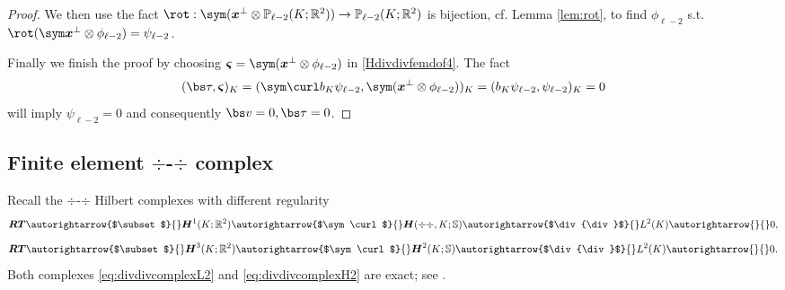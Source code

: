 \begin{proof}
We then use the fact $\rot: \sym(\boldsymbol x^{\perp}\otimes\mathbb P_{\ell-2}(K;\mathbb R^2)) \to  \mathbb P_{\ell-2}(K;\mathbb R^2)$ is bijection, cf. Lemma \ref{lem:rot}, to find $\phi_{\ell-2}$ s.t. $\rot (\sym\boldsymbol x^{\perp}\otimes\phi_{\ell -2}) = \psi_{\ell-2}$.

Finally we finish the proof by choosing $\boldsymbol \varsigma = \sym (\boldsymbol x^{\perp}\otimes \phi_{\ell -2})$ in \eqref{Hdivdivfemdof4}. The fact 
$$
(\bs \tau, \boldsymbol \varsigma)_K = (\sym\curl b_K\psi_{\ell-2},  \sym (\boldsymbol x^{\perp}\otimes \phi_{\ell -2}))_K = ( b_K\psi_{\ell-2}, \psi_{\ell-2} )_K = 0
$$
will imply $\psi_{\ell-2} = 0$ and consequently $\bs v = 0, \bs \tau = 0$.  
\end{proof}




%
%
%


\subsection{Finite element $\div$-$\div$ complex}
Recall the $\div$-$\div$ Hilbert complexes with different regularity
\begin{equation}\label{eq:divdivcomplexL2}
\boldsymbol  {RT}\autorightarrow{$\subset$}{} \boldsymbol  H^1(K;\mathbb R^2)\autorightarrow{$\sym\curl$}{} \boldsymbol{H}(\div{\div},K; \mathbb{S}) \autorightarrow{$\div{\div }$}{} L^2(K)\autorightarrow{}{}0,
\end{equation}
\begin{equation}\label{eq:divdivcomplexH2}
\boldsymbol  {RT}\autorightarrow{$\subset$}{} \boldsymbol  H^3(K;\mathbb R^2)\autorightarrow{$\sym\curl$}{} \boldsymbol{H}^2(K; \mathbb{S}) \autorightarrow{$\div{\div}$}{} L^2(K)\autorightarrow{}{}0.
\end{equation}
Both complexes \eqref{eq:divdivcomplexL2} and \eqref{eq:divdivcomplexH2} are exact; see \cite{ChenHuang2018}.

